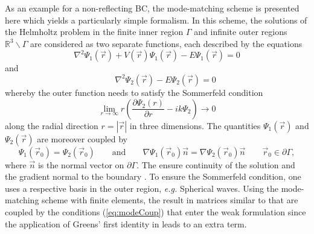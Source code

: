 As an example for a non-reflecting BC, the mode-matching scheme \cite{AstleyMM} is presented here which yields a particularly simple formalism.
In this scheme, the solutions of the Helmholtz problem in the finite inner region $\Gamma$ and infinite outer regions $\mathbb{R}^3\backslash \Gamma$ are considered as two separate functions, each described by the equations
\begin{equation}
   \label{eq:modeMatch}
   \nabla^2\Psi_1(\vec{r}) +V(\vec{r})\Psi_1(\vec{r})-E\Psi_1(\vec{r})=0 
\end{equation}
and
\begin{equation}
   \qquad \nabla^2\Psi_2(\vec{r}) -E\Psi_2(\vec{r})=0 
\end{equation}
whereby the outer function needs to satisfy the Sommerfeld condition \cite{sommerfeldCond} 
\begin{equation} \label{eq:Sommer}
\lim_{r\rightarrow\infty} r \left(\frac{\partial \Psi_2(r)}{\partial r} - ik \Psi_2  \right)\rightarrow 0
\end{equation}
along the radial direction $r=|\vec{r}|$ in three dimensions.
The quantities $\Psi_1(\vec{r})$ and $\Psi_2(\vec{r})$ are moreover coupled by 
\begin{equation}
\label{eq:modeCoup}
\Psi_1(\vec{r}_0)=\Psi_2(\vec{r}_0)  \qquad \text{and} \qquad 
\nabla \Psi_1(\vec{r}_0) \vec{n}=\nabla \Psi_2(\vec{r}_0) \vec{n}  \qquad \vec{r}_0 \in \partial \Gamma,
\end{equation}
where $\vec{n}$ is the normal vector on $\partial \Gamma$.
The  ensure continuity of the solution and the gradient normal to the boundary \cite{AstleyMM}.
To ensure the Sommerfeld condition, one uses a respective basis in the outer region, \textit{e.g.} Spherical waves.
Using the mode-matching scheme with finite elements, the  result in matrices similar to  that are coupled by the conditions (\ref{eq:modeCoup}) that enter the weak formulation since the application of Greens' first identity in  leads to an extra term.

